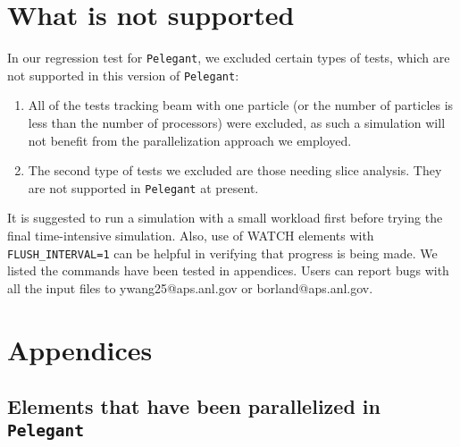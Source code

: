 \documentclass[11pt]{article}
\begin{document}
\section{What is not supported}

In our regression test for {\tt Pelegant}, we excluded certain types of tests, which are not supported
in this version of {\tt Pelegant}:

\begin{enumerate}
\item All of the tests tracking beam with one particle (or the number of particles is less than 
the number of processors) were excluded, as such a simulation will not benefit from the 
parallelization approach we employed. 


\item The second type of tests we excluded are those needing slice analysis. 
They are not supported in {\tt Pelegant} at present.

\end{enumerate}

It is suggested to run a
simulation with a small workload first before trying the final
time-intensive simulation.  Also, use of WATCH elements with {\tt
FLUSH\_INTERVAL=1} can be helpful in verifying that progress is being
made.  We listed the commands have been tested in appendices. Users can
report bugs with all the input files to ywang25@aps.anl.gov or
borland@aps.anl.gov.

\section{Appendices}

\subsection{Elements that have been parallelized in {\tt Pelegant}}
\end{document}
